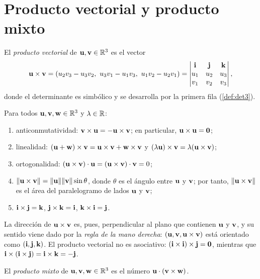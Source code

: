 \addtocounter{figure}{1}%

\addtocounter{definicion}{1}%

\section{Producto vectorial y producto mixto}

\begin{definicion}\label{def:vectorial}
El \emph{producto vectorial} de $\mathbf{u},\mathbf{v}\in\mathbb{R}^3$ es el vector
\[
\vu\times\vv=(u_2v_3-u_3v_2,\ u_3v_1-u_1v_3,\ u_1v_2-u_2v_1)
=\begin{vmatrix}\vi&\vj&\vk\\u_1&u_2&u_3\\v_1&v_2&v_3\end{vmatrix},
\]
donde el determinante es simbólico y se desarrolla por la primera fila (\cref{def:det3}).
\end{definicion}

\begin{proposicion}\label{prop:vectorial}
Para todos $\mathbf{u},\mathbf{v},\mathbf{w}\in\mathbb{R}^3$ y $\lambda\in\mathbb{R}$:
\begin{enumerate}
  \item anticonmutatividad: $\mathbf{v}\times\mathbf{u}=-\mathbf{u}\times\mathbf{v}$; en particular, $\mathbf{u}\times\mathbf{u}=\mathbf{0}$;
  \item linealidad: $(\mathbf{u}+\mathbf{w})\times\mathbf{v}=\mathbf{u}\times\mathbf{v}+\mathbf{w}\times\mathbf{v}$ y $(\lambda\mathbf{u})\times\mathbf{v}=\lambda(\mathbf{u}\times\mathbf{v})$;
  \item ortogonalidad: $(\mathbf{u}\times\mathbf{v})\cdot\mathbf{u}=(\mathbf{u}\times\mathbf{v})\cdot\mathbf{v}=0$;
  \item $\lVert\mathbf{u}\times\mathbf{v}\rVert=\lVert\mathbf{u}\rVert\lVert\mathbf{v}\rVert\sin\theta$, donde $\theta$ es el ángulo entre $\mathbf{u}$ y $\mathbf{v}$; por tanto, $\lVert\mathbf{u}\times\mathbf{v}\rVert$ es el área del paralelogramo de lados $\mathbf{u}$ y $\mathbf{v}$;
  \item $\mathbf{i}\times\mathbf{j}=\mathbf{k}$, $\mathbf{j}\times\mathbf{k}=\mathbf{i}$, $\mathbf{k}\times\mathbf{i}=\mathbf{j}$.
\end{enumerate}
\end{proposicion}

La dirección de $\mathbf{u}\times\mathbf{v}$ es, pues, perpendicular al plano que contienen $\mathbf{u}$ y $\mathbf{v}$, y su sentido viene dado por la \emph{regla de la mano derecha}: $(\mathbf{u},\mathbf{v},\mathbf{u}\times\mathbf{v})$ está orientado como $(\mathbf{i},\mathbf{j},\mathbf{k})$. El producto vectorial no es asociativo: $(\mathbf{i}\times\mathbf{i})\times\mathbf{j}=\mathbf{0}$, mientras que $\mathbf{i}\times(\mathbf{i}\times\mathbf{j})=\mathbf{i}\times\mathbf{k}=-\mathbf{j}$.

\begin{definicion}\label{def:mixto}
El \emph{producto mixto} de $\mathbf{u},\mathbf{v},\mathbf{w}\in\mathbb{R}^3$ es el número $\mathbf{u}\cdot(\mathbf{v}\times\mathbf{w})$.
\end{definicion}

